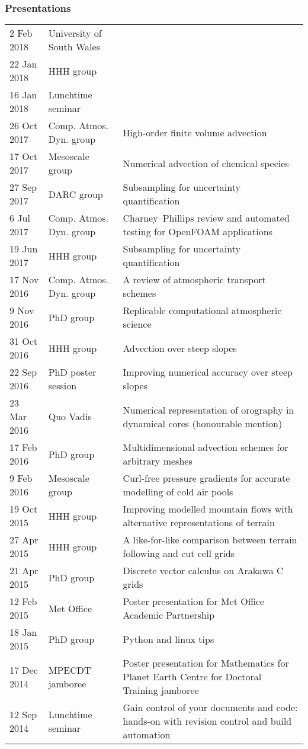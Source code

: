 \documentclass[a4paper,11pt]{article}
\begin{document}
\subsubsection*{Presentations}
\begin{tabularx}{\linewidth}{l l X}
2 Feb 2018 & University of South Wales \\
22 Jan 2018 & HHH group \\
16 Jan 2018 & Lunchtime seminar \\
26 Oct 2017 & Comp. Atmos. Dyn. group & High-order finite volume advection \\
17 Oct 2017 & Mesoscale group & Numerical advection of chemical species \\
27 Sep 2017 & DARC group & Subsampling for uncertainty quantification \\
6 Jul 2017 & Comp. Atmos. Dyn. group & Charney--Phillips review and automated testing for OpenFOAM applications \\
19 Jun 2017 & HHH group & Subsampling for uncertainty quantification \\
17 Nov 2016 & Comp. Atmos. Dyn. group & A review of atmospheric transport schemes \\
9 Nov 2016 & PhD group & Replicable computational atmospheric science \\
31 Oct 2016 & HHH group & Advection over steep slopes \\
22 Sep 2016 & PhD poster session & Improving numerical accuracy over steep slopes \\
23 Mar 2016 & Quo Vadis & Numerical representation of orography in dynamical cores (honourable mention) \\
17 Feb 2016 & PhD group & Multidimensional advection schemes for arbitrary meshes \\
9 Feb 2016 & Mesoscale group & Curl-free pressure gradients for accurate modelling of cold air pools \\
19 Oct 2015 & HHH group & Improving modelled mountain flows with alternative representations of terrain \\
27 Apr 2015 & HHH group & A like-for-like comparison between terrain following and cut cell grids \\
21 Apr 2015 & PhD group & Discrete vector calculus on Arakawa C grids \\
12 Feb 2015 & Met Office & Poster presentation for Met Office Academic Partnership \\
18 Jan 2015 & PhD group & Python and linux tips \\
17 Dec 2014 & MPECDT jamboree & Poster presentation for Mathematics for Planet Earth Centre for Doctoral Training jamboree \\
12 Sep 2014 & Lunchtime seminar  & Gain control of your documents and code: hands-on with revision control and build automation \\
\end{tabularx}
\end{document}
